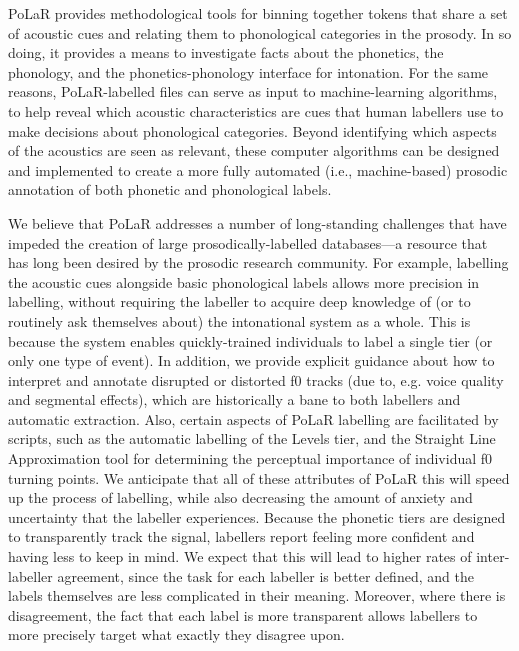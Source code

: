 PoLaR provides methodological tools for binning together tokens that share a set of acoustic cues and relating them to phonological categories in the prosody. In so doing, it provides a means to investigate facts about the phonetics, the phonology, and the phonetics-phonology interface for intonation. For the same reasons, PoLaR-labelled files can serve as input to machine-learning algorithms, to help reveal which acoustic characteristics are cues that human labellers use to make decisions about phonological categories. Beyond identifying which aspects of the acoustics are seen as relevant, these computer algorithms can be designed and implemented to create a more fully automated (i.e., machine-based) prosodic annotation of both phonetic and phonological labels. 

We believe that PoLaR addresses a number of long-standing challenges that have impeded the creation of large prosodically-labelled databases---a resource that has long been desired by the prosodic research community.  For example, labelling the acoustic cues alongside basic phonological labels allows more precision in labelling, without requiring the labeller to acquire deep knowledge of (or to routinely ask themselves about) the intonational system as a whole. This is because the system enables quickly-trained individuals to label a single tier (or only one type of event). In addition, we provide explicit guidance about how to interpret and annotate disrupted or distorted f0 tracks (due to, e.g. voice quality and segmental effects), which are historically a bane to both labellers and automatic extraction.  Also, certain aspects of PoLaR labelling are facilitated by scripts, such as the automatic labelling of the Levels tier, and the Straight Line Approximation tool for determining the perceptual importance of individual f0 turning points. We anticipate that all of these attributes of PoLaR this will speed up the process of labelling, while also decreasing the amount of anxiety and uncertainty that the labeller experiences. Because the phonetic tiers are designed to transparently track the signal, labellers report feeling more confident and having less to keep in mind. We expect that this will lead to higher rates of inter-labeller agreement, since the task for each labeller is better defined, and the labels themselves are less complicated in their meaning. Moreover, where there is disagreement, the fact that each label is more transparent allows labellers to more precisely target what exactly they disagree upon. 

